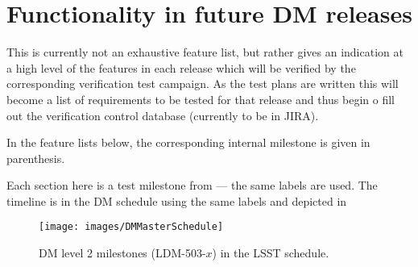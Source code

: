 \section{Functionality in future DM releases}
\label{sect:features}

This is currently not an exhaustive feature list, but rather gives an indication at a high level of the features in each release which will be verified by the corresponding verification test campaign.
As the test plans are written this will become a list of requirements to be tested for that release and thus begin o fill out the verification control database (currently to be in JIRA).

In the feature lists below, the corresponding internal milestone is given in parenthesis.

Each section here is a test milestone from  --- the same labels are used.
The timeline is in the DM schedule using the same labels and depicted in 

\begin{figure}[htbp]
        \begin{center}
                 \texttt{[image: images/DMMasterSchedule]}
                 \caption{DM level 2 milestones (LDM-503-$x$) in the LSST schedule.}
                 \label{fig:schedule}
         \end{center}
 \end{figure}


